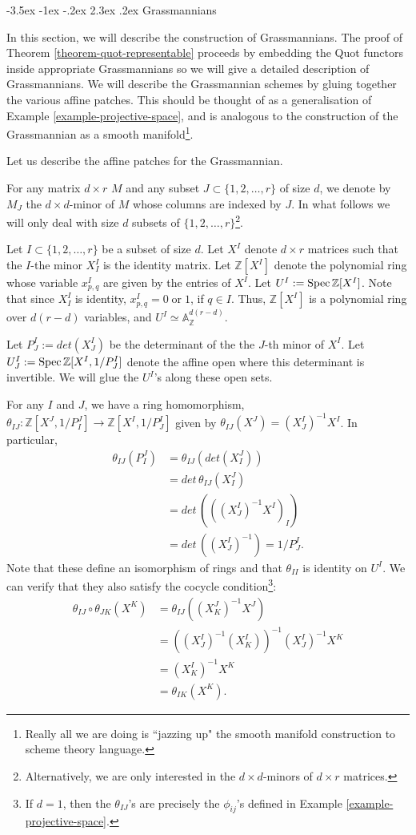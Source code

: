 \documentclass[11pt]{amsart}
\makeatletter
\renewcommand\section{\@startsection {section}{1}{\z@}%
	{-3.5ex \@plus -1ex \@minus -.2ex}%
	{2.3ex \@plus.2ex}%
	{\normalfont\scshape\center}}
\newcommand{\Spec}{{\rm Spec \,}}
\newcommand{\A}{{\mathbb A}}
\newcommand{\Z}{{\mathbb Z}}
\theoremstyle{definition}
\makeatother
\begin{document}
\section{Grassmannians}

In this section, we will describe the construction of Grassmannians. The proof of Theorem \ref{theorem-quot-representable} proceeds by embedding the Quot functors inside appropriate Grassmannians so we will give a detailed description of Grassmannians. We will describe the Grassmannian schemes by gluing together the various affine patches. This should be thought of as a generalisation of Example \ref{example-projective-space}, and is analogous to the construction of the Grassmannian as a smooth manifold\footnote{Really all we are doing is ``jazzing up" the smooth manifold construction to scheme theory language.}.

Let us describe the affine patches for the Grassmannian.

For any matrix $d\times r$ $M$ and any subset $J\subset \{1,2,\ldots,r\}$ of size $d$, we denote by $M_J$ the $d\times d$-minor of $M$ whose columns are indexed by $J$. In what follows we will only deal with size $d$ subsets of $\{1,2,\ldots,r\}$\footnote{Alternatively, we are only interested in the $d\times d$-minors of $d\times r$ matrices.}.

Let $I\subset \{1,2, \ldots,r\}$ be a subset of size $d$. Let $X^I$ denote $d\times r$ matrices such that the $I$-the minor $X^I_I$ is the identity matrix. Let $\Z[X^I]$ denote the polynomial ring whose variable $x^I_{p,q}$ are given by the entries of $X^I$. Let $U^I:=\Spec\Z[X^I]$. Note that since $X^I_I$ is identity, $x^I_{p,q}=0\; \text{or}\; 1$, if $q\in I$. Thus, $\Z[X^I]$ is a polynomial ring over  $d(r-d)$ variables, and $U^I\simeq \A^{d(r-d)}_\Z$.

Let $P^I_J:= det(X^I_J)$ be the determinant of the the $J$-th minor of $X^I$. Let $U^I_J:=\Spec\Z[X^I,1/P^I_J]$ denote the affine open where this determinant is invertible. We will glue the $U^I$'s along these open sets.

For any $I$ and $J$, we have a ring homomorphism, $\theta_{IJ}: \Z[X^J,1/P^J_I] \rightarrow \Z[X^I,1/P^I_J]$ given by $\theta_{IJ}(X^J)=(X^I_J)^{-1}X^I$. In particular, 
\begin{align*}
\theta_{IJ}(P^J_I) &= \theta_{IJ}(det(X^J_I))\\
&= det\, \theta_{IJ}(X^J_I)\\
&=det\, (((X^I_J)^{-1}X^I)_I)\\
&=det\, ((X^I_J)^{-1}) = 1/P^I_J.
\end{align*}
Note that these define an isomorphism of rings and that $\theta_{II}$ is identity on $U^I$. We can verify that they also satisfy the cocycle condition\footnote{If $d=1$, then the $\theta_{IJ}$'s are precisely the $\phi_{ij}$'s defined in Example \ref{example-projective-space}.}:
\begin{align*}
\theta_{IJ}\circ\theta_{JK}(X^K) &=\theta_{IJ}((X^J_K)^{-1}X^J)\\
&= \left((X^I_J)^{-1}(X^I_K)\right)^{-1} (X^I_J)^{-1}X^K\\
&= (X^I_K)^{-1}X^K \\
&= \theta_{IK}(X^K).
\end{align*}
\end{document}
